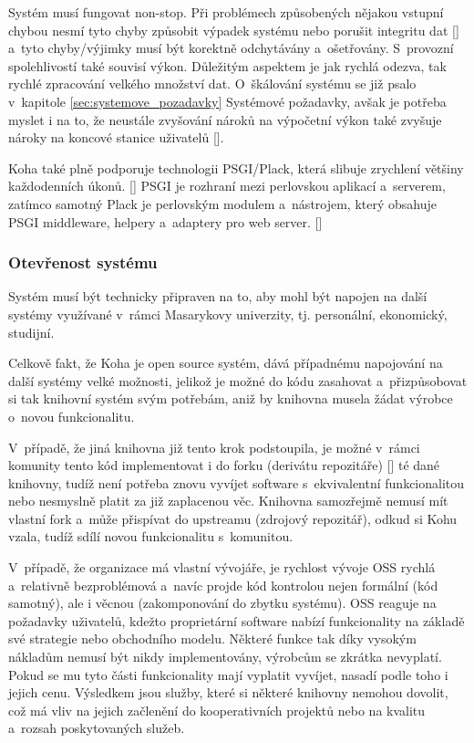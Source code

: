 \documentclass[
	11pt, oneside, printed, final, palatino, monochrome
	microtype,
	table,   %
	lof,     %
	lot     %
]{fithesis3}
\newcommand{\citepages}[2]{[\cite[#1]{#2}]}
\newcommand{\citesource}[1]{[\cite{#1}]}
\begin{document}
{Systém musí fungovat non-stop. Při problémech způsobených nějakou vstupní chybou nesmí tyto chyby způsobit výpadek systému nebo porušit integritu dat \citepages{2}{bartosek_2001_systemovy_pohled} a~tyto chyby/výjimky musí být korektně odchytávány a~ošetřovány. S~provozní spolehlivostí také souvisí výkon. Důležitým aspektem je jak rychlá odezva, tak rychlé zpracování velkého množství dat. O~škálování systému se již psalo v~kapitole \ref{sec:systemove_pozadavky} Systémové požadavky, avšak je potřeba myslet i na to, že neustále zvyšování nároků na výpočetní výkon také zvyšuje nároky na koncové stanice uživatelů \citepages{2-3}{bartosek_2001_systemovy_pohled}.

Koha také plně podporuje technologii PSGI/Plack, která slibuje zrychlení většiny každodenních úkonů. \citesource{koha_3.22_released_2016}
 PSGI je rozhraní mezi perlovskou aplikací a~serverem, zatímco samotný Plack je perlovským modulem a~nástrojem, který obsahuje PSGI middleware, helpery a~adaptery pro web server.  \citesource{psgi/plack_2016}

\subsubsection{Otevřenost systému}
Systém musí být technicky připraven na to, aby mohl být napojen na další systémy využívané v~rámci Masarykovy univerzity, tj. personální, ekonomický, studijní.

Celkově fakt, že Koha je open source systém, dává případnému napojování na další systémy velké možnosti, jelikož je možné do kódu zasahovat a~přizpůsobovat si tak knihovní systém svým potřebám, aniž by knihovna musela žádat výrobce o~novou funkcionalitu.

V~případě, že jiná knihovna již tento krok podstoupila, je možné v~rámci komunity tento kód  implementovat i do forku (derivátu repozitáře) \citepages{29}{Chaconc2009} té dané knihovny, tudíž není potřeba znovu vyvíjet software s~ekvivalentní funkcionalitou nebo nesmyslně platit za již zaplacenou věc. Knihovna samozřejmě nemusí mít vlastní fork a~může přispívat do upstreamu (zdrojový repozitář), odkud si Kohu vzala, tudíž sdílí novou funkcionalitu s~komunitou.

V~případě, že organizace má vlastní vývojáře, je rychlost vývoje OSS rychlá a~relativně bezproblémová a~navíc projde kód kontrolou nejen formální (kód samotný), ale i věcnou (zakomponování do zbytku systému). OSS reaguje na požadavky uživatelů, kdežto proprietární software nabízí funkcionality na základě své strategie nebo obchodního modelu. Některé funkce tak díky vysokým nákladům nemusí být nikdy implementovány, výrobcům se zkrátka nevyplatí. Pokud se mu tyto části funkcionality mají vyplatit vyvíjet, nasadí podle toho i jejich cenu. Výsledkem jsou služby, které si některé knihovny nemohou dovolit, což má vliv na jejich začlenění do kooperativních projektů nebo na kvalitu a~rozsah poskytovaných služeb.

}
\end{document}
